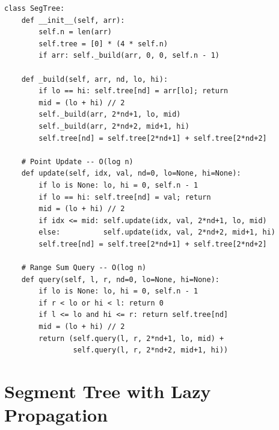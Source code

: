 \documentclass[11pt,a4paper]{report}
\begin{document}
\begin{lstlisting}
class SegTree:
    def __init__(self, arr):
        self.n = len(arr)
        self.tree = [0] * (4 * self.n)
        if arr: self._build(arr, 0, 0, self.n - 1)

    def _build(self, arr, nd, lo, hi):
        if lo == hi: self.tree[nd] = arr[lo]; return
        mid = (lo + hi) // 2
        self._build(arr, 2*nd+1, lo, mid)
        self._build(arr, 2*nd+2, mid+1, hi)
        self.tree[nd] = self.tree[2*nd+1] + self.tree[2*nd+2]

    # Point Update -- O(log n)
    def update(self, idx, val, nd=0, lo=None, hi=None):
        if lo is None: lo, hi = 0, self.n - 1
        if lo == hi: self.tree[nd] = val; return
        mid = (lo + hi) // 2
        if idx <= mid: self.update(idx, val, 2*nd+1, lo, mid)
        else:          self.update(idx, val, 2*nd+2, mid+1, hi)
        self.tree[nd] = self.tree[2*nd+1] + self.tree[2*nd+2]

    # Range Sum Query -- O(log n)
    def query(self, l, r, nd=0, lo=None, hi=None):
        if lo is None: lo, hi = 0, self.n - 1
        if r < lo or hi < l: return 0
        if l <= lo and hi <= r: return self.tree[nd]
        mid = (lo + hi) // 2
        return (self.query(l, r, 2*nd+1, lo, mid) +
                self.query(l, r, 2*nd+2, mid+1, hi))
\end{lstlisting}

\section{Segment Tree with Lazy Propagation}
\end{document}
